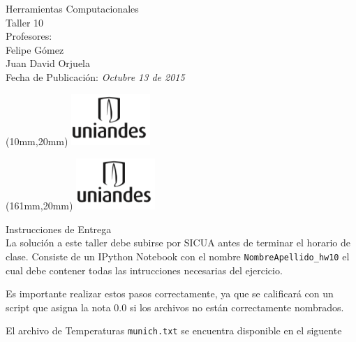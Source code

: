 \documentclass[11pt,letterpaper]{exam}
\begin{document}
\begin{center}
{\Large Herramientas Computacionales \\
 Taller 10}\\
Profesores: \\ Felipe G\'omez\\ Juan David Orjuela \\
Fecha de Publicación: {\small \it Octubre 13 de 2015}\\
\end{center}

\begin{textblock*}{40mm}(10mm,20mm)
  \includegraphics[width=3cm]{logoUniandes.png}
\end{textblock*}

\begin{textblock*}{40mm}(161mm,20mm)
  \includegraphics[width=3cm]{logoUniandes.png}
\end{textblock*}

\vspace{0.5cm}

{\Large Instrucciones de Entrega}\\

\noindent
La solución a este taller debe subirse por SICUA antes de terminar 
el horario de clase.
\noindent
Consiste de un IPython Notebook con el nombre
\verb"NombreApellido_hw10"
el cual debe contener todas las intrucciones necesarias del ejercicio.

Es importante realizar estos pasos correctamente, ya que se calificará con un
script que asigna la nota 0.0 si los archivos no están correctamente nombrados.


\noindent El archivo de Temperaturas \verb"munich.txt" se encuentra disponible en el siguente 
\end{document}

